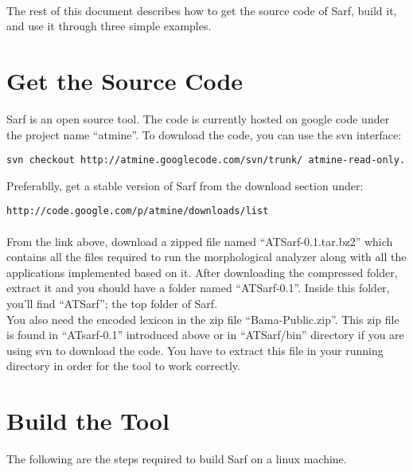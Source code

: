 \documentclass{article}
\begin{document}
\paragraph{}
The rest of this document describes how to get the source code of Sarf, build it, and use it through three simple examples.

\section{Get the Source Code}
\label{sec:sourcecode}

Sarf is an open source tool. The code is currently hosted on google code under the project name ``atmine''. To download the code, you can use the svn interface:\\
\begin{verbatim}
svn checkout http://atmine.googlecode.com/svn/trunk/ atmine-read-only.
\end{verbatim}
Preferablly, get a stable version of Sarf from the download section under:\\
\begin{verbatim}
http://code.google.com/p/atmine/downloads/list
\end{verbatim}
\paragraph{}
From the link above, download a zipped file named ``ATSarf-0.1.tar.bz2'' which contains all the files required to run the morphological analyzer along with all the applications implemented based on it. After downloading the compressed folder, extract it and you should have a folder named ``ATSarf-0.1''. Inside this folder, you'll find ``ATSarf''; the top folder of Sarf.\\
You also need the encoded lexicon in the zip file ``Bama-Public.zip''. This zip file is found in ``ATsarf-0.1'' introduced above or in ``ATSarf/bin'' directory if you are using svn to download the code. You have to extract this file in your running directory in order for the tool to work correctly.

\section{Build the Tool}
The following are the steps required to build Sarf on a linux machine.
\end{document}
